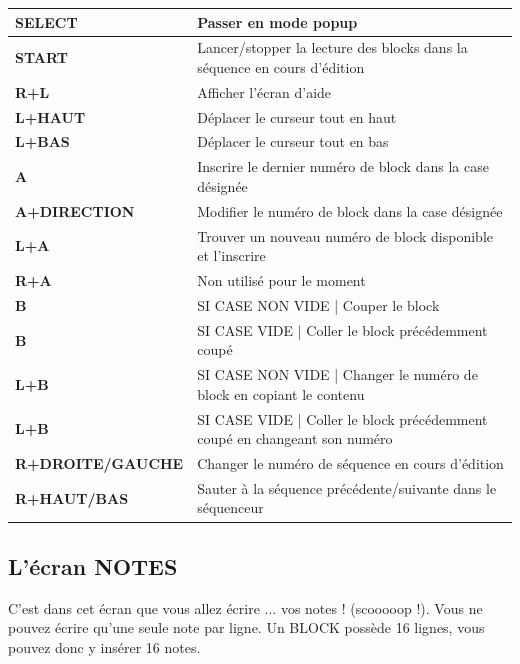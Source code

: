 \documentclass[12pt,a4paper]{article}
\begin{document}
        \begin{supertabular}{|l|p{11cm}|}
        \hline
            {\bf SELECT} & Passer en mode popup \\
            \hline
            {\bf START} & Lancer/stopper la lecture des blocks dans la séquence en cours d'édition \\
            \hline
            {\bf R+L} & Afficher l'écran d'aide \\
            \hline
            {\bf L+HAUT} & Déplacer le curseur tout en haut \\
            \hline
            {\bf L+BAS} & Déplacer le curseur tout en bas \\
            \hline
            {\bf A} & Inscrire le dernier numéro de block dans la case désignée \\
            \hline
            {\bf A+DIRECTION} & Modifier le numéro de block dans la case désignée \\
            \hline
            {\bf L+A} & Trouver un nouveau numéro de block disponible et l'inscrire \\
            \hline
            {\bf R+A} & Non utilisé pour le moment \\
            \hline
            {\bf B} & SI CASE NON VIDE | Couper le block \\
            \hline
            {\bf B} & SI CASE VIDE | Coller le block précédemment coupé \\
            \hline
            {\bf L+B} & SI CASE NON VIDE | Changer le numéro de block en copiant le contenu \\
            \hline
            {\bf L+B} & SI CASE VIDE | Coller le block précédemment coupé en changeant son numéro \\
            \hline
            {\bf R+DROITE/GAUCHE} & Changer le numéro de séquence en cours d'édition \\
            \hline
            {\bf R+HAUT/BAS} & Sauter à la séquence précédente/suivante dans le séquenceur \\
        \hline
        \end{supertabular}


    \subsection{L'écran NOTES}

    C'est dans cet écran que vous allez écrire ... vos notes ! (scooooop !). Vous ne pouvez écrire qu'une seule note par ligne. Un BLOCK possède 16 lignes, vous pouvez donc y insérer 16 notes.\medskip
\end{document}
